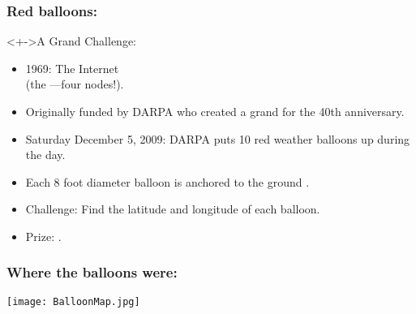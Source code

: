 \begin{frame}
  \frametitle{Red balloons:}

  \begin{block}<+->{A Grand Challenge:}
    \begin{itemize}
    \item<+->
      1969: The Internet \\
      (the ---four nodes!).
    \item<+->
      Originally funded by DARPA who created 
      a grand
      for the 40th anniversary.
    \item<+->
      Saturday December 5, 2009: DARPA 
      puts 10 red weather balloons up during the day.
    \item<+->
      Each 8 foot diameter balloon is anchored to the ground
      .
    \item<+->
      Challenge: Find the latitude and longitude of each balloon.
    \item<+->
      Prize: .
    \end{itemize}
  \end{block}


\end{frame}

\begin{frame}
  \frametitle{Where the balloons were:}

  \texttt{[image: BalloonMap.jpg]}
\end{frame}

